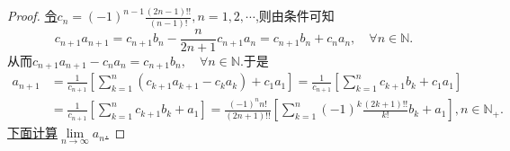 \documentclass[../../main.tex]{subfiles}%
\begin{document}
\begin{proof}
\hyperlink{构造数列c_n的思路}{令\(c_n = (-1)^{n - 1}\frac{(2n - 1)!!}{(n - 1)!},n=1,2,\cdots\)},则由条件可知
\[
c_{n + 1}a_{n + 1}=c_{n + 1}b_n-\frac{n}{2n + 1}c_{n + 1}a_n=c_{n + 1}b_n + c_na_n, \quad \forall n\in \mathbb{N}.
\]
从而\(c_{n + 1}a_{n + 1}-c_na_n=c_{n + 1}b_n, \quad \forall n\in \mathbb{N}\).于是
\begin{align}
a_{n+1}&=\frac{1}{c_{n+1}}\left[ \sum_{k=1}^n{\left( c_{k+1}a_{k+1}-c_ka_k \right)}+c_1a_1 \right] =\frac{1}{c_{n+1}}\left[ \sum_{k=1}^n{c_{k+1}b_k}+c_1a_1 \right] 
\nonumber
\\
&=\frac{1}{c_{n+1}}\left[ \sum_{k=1}^n{c_{k+1}b_k}+a_1 \right] =\frac{\left( -1 \right) ^nn!}{\left( 2n+1 \right) !!}\left[ \sum_{k=1}^n{\left( -1 \right) ^k\frac{\left( 2k+1 \right) !!}{k!}b_k}+a_1 \right] ,n\in \mathbb{N} _+. \label{example4.44-1.1}
\end{align}
\hyperlink{example4.44解法的思路分析}{下面计算$\underset{n\rightarrow \infty}{\lim}a_n$.}


\end{proof}
\end{document}
